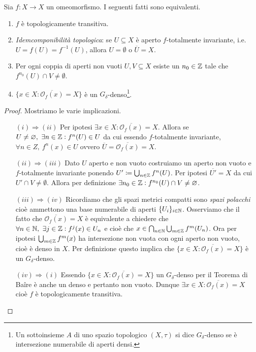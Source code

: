 \begin{thm}
	Sia $ f \colon X \to X $ un omeomorfismo. I seguenti fatti sono equivalenti.
	\begin{enumerate}[label=(\roman*)]
		\item $ f $ è topologicamente transitiva.
		\item \emph{Idemcomponibilità topologica}: se $ U \subseteq X $ è aperto $ f $-totalmente invariante, i.e. $ U = f(U) = f^{-1}(U) $, allora $ U = \emptyset $ o $ \overline{U} = X $.
		\item Per ogni coppia di aperti non vuoti $ U, V \subseteq X $ esiste un $ n_0 \in \mathbb{Z} $ tale che $ f^{n_0}(U) \cap V \neq \emptyset $. 
		\item $ \{x \in X : \overline{\mathcal{O}_f(x)} = X\} $ è un $ G_\delta $-denso\footnote{%
			Un sottoinsieme $ A $ di uno spazio topologico $ (X, \tau) $ si dice $ G_\delta $-denso se è intersezione numerabile di aperti densi. 
		}.
	\end{enumerate}
\end{thm}
%
\begin{proof}
	Mostriamo le varie implicazioni. 
	\begin{enumerate}
		\item[$ (i) \Rightarrow (ii) $] Per ipotesi $ \exists x \in X : \overline{\mathcal{O}_f(x)} = X $. Allora se $ U \neq \varnothing, \ \exists n \in \mathbb{Z} : f^{n}(U) \in U $ da cui essendo $ f $-totalmente invariante, $ \forall n \in Z, \ f^n(x) \in U $ ovvero $ \overline{U} = \overline{\mathcal{O}_f(x)} = X $. 
		\item[$ (ii) \Rightarrow (iii) $] Dato $ U $ aperto e non vuoto costruiamo un aperto non vuoto e $ f $-totalmente invariante ponendo $ U' \coloneqq \bigcup_{n \in \mathbb{Z}} f^n(U) $. Per ipotesi $ \overline{U'} = X $ da cui $ U' \cap V \neq \emptyset $. Allora per definizione $ \exists n_0 \in \mathbb{Z} : f^{n_0}(U) \cap V \neq \varnothing $.
		\item[$ (iii) \Rightarrow (iv) $] Ricordiamo che gli spazi metrici compatti sono \emph{spazi polacchi} cioè ammettono una base numerabile di aperti $ \{U_i\}_{i \in \mathbb{N}} $. Osserviamo che il fatto che $ \overline{\mathcal{O}_f(x)} = X $ è equivalente a chiedere che $ \forall n \in \mathbb{N}, \ \exists j \in \mathbb{Z} : f^j(x) \in U_n $ e cioè che $ x \in \bigcap_{n \in \mathbb{N}} \bigcup_{m \in \mathbb{Z}} f^{m}(U_n) $. Ora per ipotesi $ \bigcup_{m \in \mathbb{Z}} f^m(x) $ ha intersezione non vuota con ogni aperto non vuoto, cioè è denso in $ X $. Per definizione questo implica che $ \{x \in X : \overline{\mathcal{O}_f(x)} = X\} $ è un $ G_\delta $-denso. 
		\item[$ (iv) \Rightarrow (i) $] Essendo $ \{x \in X : \overline{\mathcal{O}_f(x)} = X\} $ un $ G_\delta $-denso per il Teorema di Ba\^{i}re è anche un denso e pertanto non vuoto. Dunque $ \exists x \in X : \overline{\mathcal{O}_f(x)} = X $ cioè $ f $ è topologicamente transitiva. \qedhere
	\end{enumerate}
\end{proof}

